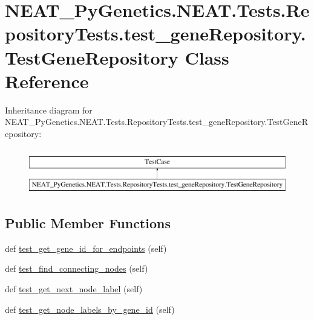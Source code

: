 \hypertarget{classNEAT__PyGenetics_1_1NEAT_1_1Tests_1_1RepositoryTests_1_1test__geneRepository_1_1TestGeneRepository}{}\section{N\+E\+A\+T\+\_\+\+Py\+Genetics.\+N\+E\+A\+T.\+Tests.\+Repository\+Tests.\+test\+\_\+gene\+Repository.\+Test\+Gene\+Repository Class Reference}
\label{classNEAT__PyGenetics_1_1NEAT_1_1Tests_1_1RepositoryTests_1_1test__geneRepository_1_1TestGeneRepository}
Inheritance diagram for N\+E\+A\+T\+\_\+\+Py\+Genetics.\+N\+E\+A\+T.\+Tests.\+Repository\+Tests.\+test\+\_\+gene\+Repository.\+Test\+Gene\+Repository\+:\begin{figure}[H]
\begin{center}
\leavevmode
\includegraphics[height=2.000000cm]{classNEAT__PyGenetics_1_1NEAT_1_1Tests_1_1RepositoryTests_1_1test__geneRepository_1_1TestGeneRepository}
\end{center}
\end{figure}
\subsection*{Public Member Functions}
\begin{DoxyCompactItemize}
\item 
def \hyperlink{classNEAT__PyGenetics_1_1NEAT_1_1Tests_1_1RepositoryTests_1_1test__geneRepository_1_1TestGeneRepository_a9688b85e7f9a1eade7514bee5e4976e1}{test\+\_\+get\+\_\+gene\+\_\+id\+\_\+for\+\_\+endpoints} (self)
\item 
def \hyperlink{classNEAT__PyGenetics_1_1NEAT_1_1Tests_1_1RepositoryTests_1_1test__geneRepository_1_1TestGeneRepository_a1e243ceab606dbf34e054672cb2695b3}{test\+\_\+find\+\_\+connecting\+\_\+nodes} (self)
\item 
def \hyperlink{classNEAT__PyGenetics_1_1NEAT_1_1Tests_1_1RepositoryTests_1_1test__geneRepository_1_1TestGeneRepository_af1ecb2f51fa36fee4c9dc2b8e9b49348}{test\+\_\+get\+\_\+next\+\_\+node\+\_\+label} (self)
\item 
def \hyperlink{classNEAT__PyGenetics_1_1NEAT_1_1Tests_1_1RepositoryTests_1_1test__geneRepository_1_1TestGeneRepository_a8928178404a7f810e00610192a8fd368}{test\+\_\+get\+\_\+node\+\_\+labels\+\_\+by\+\_\+gene\+\_\+id} (self)
\end{DoxyCompactItemize}


